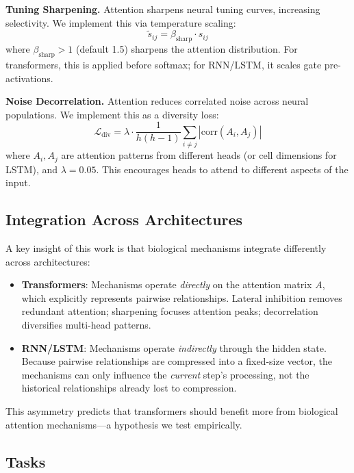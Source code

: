 \textbf{Tuning Sharpening.} Attention sharpens neural tuning curves, increasing selectivity. We implement this via temperature scaling:
\begin{equation}
\tilde{s}_{ij} = \beta_{\text{sharp}} \cdot s_{ij}
\end{equation}
where $\beta_{\text{sharp}} > 1$ (default 1.5) sharpens the attention distribution. For transformers, this is applied before softmax; for RNN/LSTM, it scales gate pre-activations.

\textbf{Noise Decorrelation.} Attention reduces correlated noise across neural populations. We implement this as a diversity loss:
\begin{equation}
\mathcal{L}_{\text{div}} = \lambda \cdot \frac{1}{h(h-1)} \sum_{i \neq j} |\text{corr}(A_i, A_j)|
\end{equation}
where $A_i, A_j$ are attention patterns from different heads (or cell dimensions for LSTM), and $\lambda=0.05$. This encourages heads to attend to different aspects of the input.

\subsection{Integration Across Architectures}

A key insight of this work is that biological mechanisms integrate differently across architectures:

\begin{itemize}
\item \textbf{Transformers}: Mechanisms operate \textit{directly} on the attention matrix $A$, which explicitly represents pairwise relationships. Lateral inhibition removes redundant attention; sharpening focuses attention peaks; decorrelation diversifies multi-head patterns.

\item \textbf{RNN/LSTM}: Mechanisms operate \textit{indirectly} through the hidden state. Because pairwise relationships are compressed into a fixed-size vector, the mechanisms can only influence the \textit{current} step's processing, not the historical relationships already lost to compression.
\end{itemize}

This asymmetry predicts that transformers should benefit more from biological attention mechanisms---a hypothesis we test empirically.

\subsection{Tasks}

